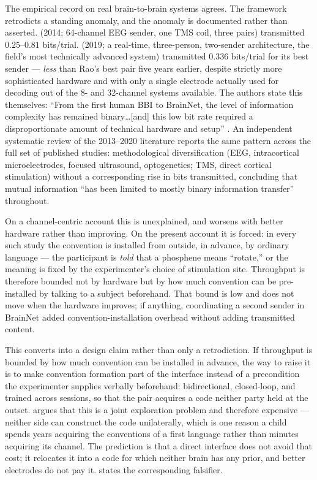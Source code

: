 \documentclass[11pt,a4paper]{article}
\theoremstyle{plain}
\theoremstyle{definition}
\theoremstyle{remark}
\begin{document}
The empirical record on real brain-to-brain systems agrees. The framework retrodicts a standing anomaly, and
the anomaly is documented rather than asserted. \citet{rao2014direct} (2014; 64-channel EEG sender, one TMS
coil, three pairs) transmitted $0.25$--$0.81$ bits/trial. \citet{jiang2019brainnet} (2019; a real-time,
three-person, two-sender architecture, the field's most technically advanced system) transmitted $0.336$
bits/trial for its best sender --- \emph{less} than Rao's best pair five years earlier, despite strictly more
sophisticated hardware and with only a single electrode actually used for decoding out of the 8- and
32-channel systems available. The authors state this themselves: ``From the first human BBI to BrainNet, the
level of information complexity has remained binary\ldots [and] this low bit rate required a disproportionate
amount of technical hardware and setup'' \citep{jiang2019brainnet}. An independent systematic review of the
2013--2020 literature \citep{nam2021prisma} reports the same pattern across the full set of published
studies: methodological diversification (EEG, intracortical microelectrodes, focused ultrasound,
optogenetics; TMS, direct cortical stimulation) without a corresponding rise in bits transmitted, concluding
that mutual information ``has been limited to mostly binary information transfer'' throughout.

On a channel-centric account this is unexplained, and worsens with better hardware rather than improving. On
the present account it is forced: in every such study the convention is installed from outside, in advance,
by ordinary language --- the participant is \emph{told} that a phosphene means ``rotate,'' or the meaning is
fixed by the experimenter's choice of stimulation site. Throughput is therefore bounded not by hardware but
by how much convention can be pre-installed by talking to a subject beforehand. That bound is low and does not
move when the hardware improves; if anything, coordinating a second sender in BrainNet added
convention-installation overhead without adding transmitted content.

This converts into a design claim rather than only a retrodiction. If throughput is bounded by how much
convention can be installed in advance, the way to raise it is to make convention formation part of the
interface instead of a precondition the experimenter supplies verbally beforehand: bidirectional,
closed-loop, and trained across sessions, so that the pair acquires a code neither party held at the outset.
 argues that this is a joint exploration problem and therefore expensive --- neither side can
construct the code unilaterally, which is one reason a child spends years acquiring the conventions of a
first language rather than minutes acquiring its channel. The prediction is that a direct interface does not
avoid that cost; it relocates it into a code for which neither brain has any prior, and better electrodes do
not pay it.  states the corresponding falsifier.
\end{document}
